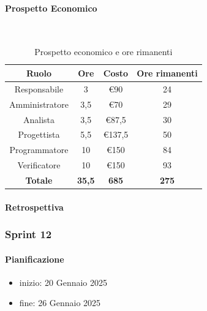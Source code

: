 \documentclass{article}
\begin{document}
                \paragraph{Prospetto Economico}\mbox{}\\
                \begin{table}[H]
                    \centering
                    \begin{tabular}{|c|c|c|c|}
                    \hline
                    \textbf{Ruolo}  & \textbf{Ore}  & \textbf{Costo} & \textbf{Ore rimanenti} \\ \hline
                    Responsabile    & 3             & €90            & 24                     \\ \hline
                    Amministratore  & 3,5           & €70            & 29                     \\ \hline
                    Analista        & 3,5           & €87,5          & 30                     \\ \hline
                    Progettista     & 5,5           & €137,5         & 50                     \\ \hline
                    Programmatore   & 10            & €150           & 84                     \\ \hline
                    Verificatore    & 10            & €150           & 93                     \\ \hline
                    \textbf{Totale} & \textbf{35,5} & \textbf{685}   & \textbf{275}           \\ \hline
                    \end{tabular}
                    \caption{Prospetto economico e ore rimanenti}
                \end{table}

                \paragraph{Retrospettiva}
            \subsubsection{Sprint 12}
                \paragraph{Pianificazione}
                \begin{itemize}
                    \item inizio: 20 Gennaio 2025
                    \item fine: 26 Gennaio 2025
                \end{itemize}
\end{document}
